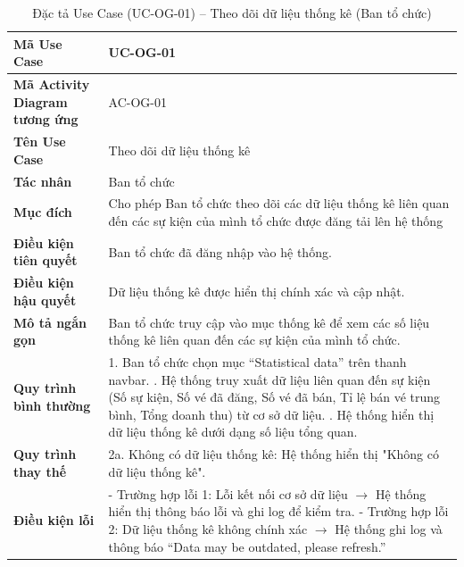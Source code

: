 \renewcommand{\arraystretch}{1.3}
\setlength{\tabcolsep}{4pt}
\begin{longtable}{|p{}|p{}|}
\caption{Đặc tả Use Case (UC-OG-01) -- Theo dõi dữ liệu thống kê (Ban tổ chức) }\label{tab:uc_statistics}\\
\hline
\textbf{Mã Use Case} & UC-OG-01 \\ \hline
\textbf{Mã Activity Diagram tương ứng} & AC-OG-01 \\ \hline
\textbf{Tên Use Case} & Theo dõi dữ liệu thống kê \\ \hline
\textbf{Tác nhân} & Ban tổ chức \\ \hline
\textbf{Mục đích} & Cho phép Ban tổ chức theo dõi các dữ liệu thống kê liên quan đến các sự kiện của mình tổ chức được đăng tải lên hệ thống \\ \hline
\textbf{Điều kiện tiên quyết} & Ban tổ chức đã đăng nhập vào hệ thống. \\ \hline
\textbf{Điều kiện hậu quyết} & Dữ liệu thống kê được hiển thị chính xác và cập nhật. \\ \hline
\textbf{Mô tả ngắn gọn} & Ban tổ chức truy cập vào mục thống kê để xem các số liệu thống kê liên quan đến các sự kiện của mình tổ chức. \\ \hline
\textbf{Quy trình bình thường} &
1. Ban tổ chức chọn mục “Statistical data” trên thanh navbar. \newline
2. Hệ thống truy xuất dữ liệu liên quan đến sự kiện (Số sự kiện, Số vé đã đăng, Số vé đã bán, Tỉ lệ bán vé trung bình, Tổng doanh thu) từ cơ sở dữ liệu. \newline
3. Hệ thống hiển thị dữ liệu thống kê dưới dạng số liệu tổng quan. \\ \hline
\textbf{Quy trình thay thế} &
2a. Không có dữ liệu thống kê: Hệ thống hiển thị "Không có dữ liệu thống kê". \\ \hline
\textbf{Điều kiện lỗi} &
- Trường hợp lỗi 1: Lỗi kết nối cơ sở dữ liệu $\rightarrow$ Hệ thống hiển thị thông báo lỗi và ghi log để kiểm tra. \newline
- Trường hợp lỗi 2: Dữ liệu thống kê không chính xác $\rightarrow$ Hệ thống ghi log và thông báo “Data may be outdated, please refresh.” \\ \hline
\end{longtable}



